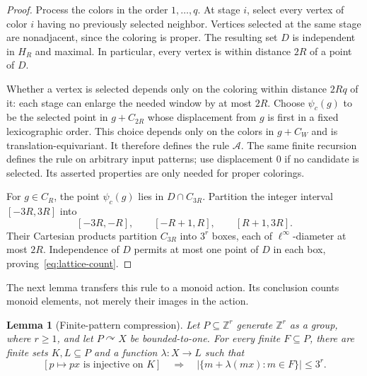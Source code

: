 \documentclass[11pt,letterpaper]{article}
\newtheorem{lemma}[theorem]{Lemma}
\theoremstyle{definition}
\newcommand{\ZZ}{\mathbb Z}
\newcommand{\act}{\curvearrowright}
\begin{document}
\begin{proof}
Process the colors in the order $1,\ldots,q$. At stage $i$, select every
vertex of color $i$ having no previously selected neighbor. Vertices
selected at the same stage are nonadjacent, since the coloring is proper.
The resulting set $D$ is independent in $H_R$ and maximal. In particular,
every vertex is within distance $2R$ of a point of $D$.

Whether a vertex is selected depends only on the coloring within distance
$2Rq$ of it: each stage can enlarge the needed window by at most $2R$.
Choose $\psi_c(g)$ to be the selected point in $g+C_{2R}$ whose displacement
from $g$ is first in a fixed lexicographic order. This choice depends only
on the colors in $g+C_W$ and is translation-equivariant. It therefore
defines the rule $\mathcal A$. The same finite recursion defines the rule
on arbitrary input patterns; use displacement $0$ if no candidate is
selected. Its asserted properties are only needed for proper colorings.

For $g\in C_R$, the point $\psi_c(g)$ lies in $D\cap C_{3R}$. Partition
the integer interval $[-3R,3R]$ into
\[
 [-3R,-R],\qquad [-R+1,R],\qquad [R+1,3R].
\]
Their Cartesian products partition $C_{3R}$ into $3^r$ boxes, each of
$\ell^\infty$-diameter at most $2R$. Independence of $D$ permits at most one
point of $D$ in each box, proving~\eqref{eq:lattice-count}.
\end{proof}

The next lemma transfers this rule to a monoid action. Its conclusion
counts monoid elements, not merely their images in the action.

\begin{lemma}[Finite-pattern compression]\label{lem:compression}
Let $P\subseteq\ZZ^r$ generate $\ZZ^r$ as a group, where $r\ge1$, and let
$P\act X$ be bounded-to-one. For every finite $F\subseteq P$, there are
finite sets $K,L\subseteq P$ and a function $\lambda:X\to L$ such that
\begin{equation}\label{eq:compression}
 \left[p\mapsto px\text{ is injective on }K\right]
 \quad\Longrightarrow\quad
 \bigl|\{m+\lambda(mx):m\in F\}\bigr|\le3^r.
\end{equation}
\end{lemma}
\end{document}
